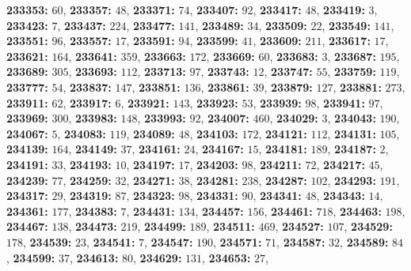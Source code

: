 \textsf{\bfseries 233353:} $60$, \textsf{\bfseries 233357:} $48$, \textsf{\bfseries 233371:} $74$, \textsf{\bfseries 233407:} $92$, \textsf{\bfseries 233417:} $48$, \textsf{\bfseries 233419:} $3$, \textsf{\bfseries 233423:} $7$, \textsf{\bfseries 233437:} $224$, \textsf{\bfseries 233477:} $141$, \textsf{\bfseries 233489:} $34$, \textsf{\bfseries 233509:} $22$, \textsf{\bfseries 233549:} $141$, \textsf{\bfseries 233551:} $96$, \textsf{\bfseries 233557:} $17$, \textsf{\bfseries 233591:} $94$, \textsf{\bfseries 233599:} $41$, \textsf{\bfseries 233609:} $211$, \textsf{\bfseries 233617:} $17$, \textsf{\bfseries 233621:} $164$, \textsf{\bfseries 233641:} $359$, \textsf{\bfseries 233663:} $172$, \textsf{\bfseries 233669:} $60$, \textsf{\bfseries 233683:} $3$, \textsf{\bfseries 233687:} $195$, \textsf{\bfseries 233689:} $305$, \textsf{\bfseries 233693:} $112$, \textsf{\bfseries 233713:} $97$, \textsf{\bfseries 233743:} $12$, \textsf{\bfseries 233747:} $55$, \textsf{\bfseries 233759:} $119$, \textsf{\bfseries 233777:} $54$, \textsf{\bfseries 233837:} $147$, \textsf{\bfseries 233851:} $136$, \textsf{\bfseries 233861:} $39$, \textsf{\bfseries 233879:} $127$, \textsf{\bfseries 233881:} $273$, \textsf{\bfseries 233911:} $62$, \textsf{\bfseries 233917:} $6$, \textsf{\bfseries 233921:} $143$, \textsf{\bfseries 233923:} $53$, \textsf{\bfseries 233939:} $98$, \textsf{\bfseries 233941:} $97$, \textsf{\bfseries 233969:} $300$, \textsf{\bfseries 233983:} $148$, \textsf{\bfseries 233993:} $92$, \textsf{\bfseries 234007:} $460$, \textsf{\bfseries 234029:} $3$, \textsf{\bfseries 234043:} $190$, \textsf{\bfseries 234067:} $5$, \textsf{\bfseries 234083:} $119$, \textsf{\bfseries 234089:} $48$, \textsf{\bfseries 234103:} $172$, \textsf{\bfseries 234121:} $112$, \textsf{\bfseries 234131:} $105$, \textsf{\bfseries 234139:} $164$, \textsf{\bfseries 234149:} $37$, \textsf{\bfseries 234161:} $24$, \textsf{\bfseries 234167:} $15$, \textsf{\bfseries 234181:} $189$, \textsf{\bfseries 234187:} $2$, \textsf{\bfseries 234191:} $33$, \textsf{\bfseries 234193:} $10$, \textsf{\bfseries 234197:} $17$, \textsf{\bfseries 234203:} $98$, \textsf{\bfseries 234211:} $72$, \textsf{\bfseries 234217:} $45$, \textsf{\bfseries 234239:} $77$, \textsf{\bfseries 234259:} $32$, \textsf{\bfseries 234271:} $38$, \textsf{\bfseries 234281:} $238$, \textsf{\bfseries 234287:} $102$, \textsf{\bfseries 234293:} $191$, \textsf{\bfseries 234317:} $29$, \textsf{\bfseries 234319:} $87$, \textsf{\bfseries 234323:} $98$, \textsf{\bfseries 234331:} $90$, \textsf{\bfseries 234341:} $48$, \textsf{\bfseries 234343:} $14$, \textsf{\bfseries 234361:} $177$, \textsf{\bfseries 234383:} $7$, \textsf{\bfseries 234431:} $134$, \textsf{\bfseries 234457:} $156$, \textsf{\bfseries 234461:} $718$, \textsf{\bfseries 234463:} $198$, \textsf{\bfseries 234467:} $138$, \textsf{\bfseries 234473:} $219$, \textsf{\bfseries 234499:} $189$, \textsf{\bfseries 234511:} $469$, \textsf{\bfseries 234527:} $107$, \textsf{\bfseries 234529:} $178$, \textsf{\bfseries 234539:} $23$, \textsf{\bfseries 234541:} $7$, \textsf{\bfseries 234547:} $190$, \textsf{\bfseries 234571:} $71$, \textsf{\bfseries 234587:} $32$, \textsf{\bfseries 234589:} $84$, \textsf{\bfseries 234599:} $37$, \textsf{\bfseries 234613:} $80$, \textsf{\bfseries 234629:} $131$, \textsf{\bfseries 234653:} $27$, 
